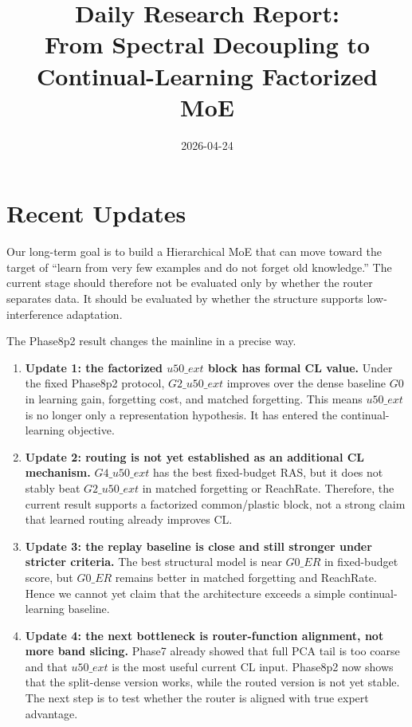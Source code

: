 \documentclass[11pt]{article}
\title{Daily Research Report:\\From Spectral Decoupling to Continual-Learning Factorized MoE}
\author{}
\date{2026-04-24}
\begin{document}
\maketitle

\section{Recent Updates}

Our long-term goal is to build a Hierarchical MoE that can move toward the target of ``learn from very few examples and do not forget old knowledge.'' The current stage should therefore not be evaluated only by whether the router separates data. It should be evaluated by whether the structure supports low-interference adaptation.

The Phase8p2 result changes the mainline in a precise way.

\begin{enumerate}[leftmargin=1.5em]
    \item \textbf{Update 1: the factorized $u50\_ext$ block has formal CL value.}
    Under the fixed Phase8p2 protocol, $G2\_u50\_ext$ improves over the dense baseline $G0$ in learning gain, forgetting cost, and matched forgetting. This means $u50\_ext$ is no longer only a representation hypothesis. It has entered the continual-learning objective.

    \item \textbf{Update 2: routing is not yet established as an additional CL mechanism.}
    $G4\_u50\_ext$ has the best fixed-budget RAS, but it does not stably beat $G2\_u50\_ext$ in matched forgetting or ReachRate. Therefore, the current result supports a factorized common/plastic block, not a strong claim that learned routing already improves CL.

    \item \textbf{Update 3: the replay baseline is close and still stronger under stricter criteria.}
    The best structural model is near $G0\_ER$ in fixed-budget score, but $G0\_ER$ remains better in matched forgetting and ReachRate. Hence we cannot yet claim that the architecture exceeds a simple continual-learning baseline.

    \item \textbf{Update 4: the next bottleneck is router-function alignment, not more band slicing.}
    Phase7 already showed that full PCA tail is too coarse and that $u50\_ext$ is the most useful current CL input. Phase8p2 now shows that the split-dense version works, while the routed version is not yet stable. The next step is to test whether the router is aligned with true expert advantage.
\end{enumerate}
\end{document}
